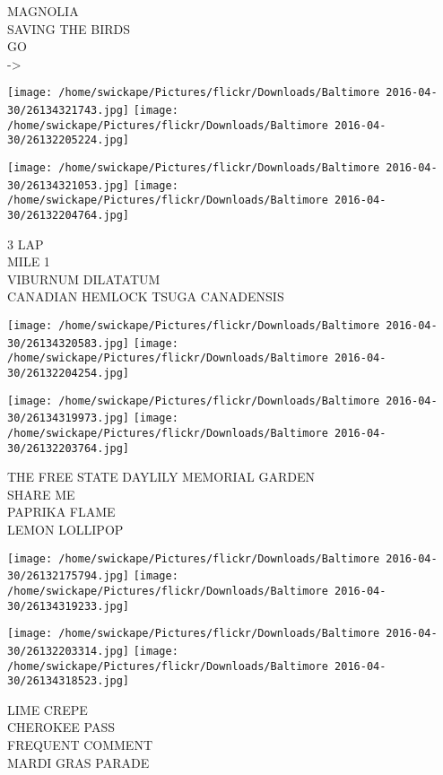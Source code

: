 \documentclass[10pt,letterpaper]{article}
\begin{document}
MAGNOLIA\\
SAVING THE BIRDS\\
GO\\
{-}>\\
\pagebreak

\texttt{[image: /home/swickape/Pictures/flickr/Downloads/Baltimore 2016-04-30/26134321743.jpg]}
\texttt{[image: /home/swickape/Pictures/flickr/Downloads/Baltimore 2016-04-30/26132205224.jpg]}

\texttt{[image: /home/swickape/Pictures/flickr/Downloads/Baltimore 2016-04-30/26134321053.jpg]}
\texttt{[image: /home/swickape/Pictures/flickr/Downloads/Baltimore 2016-04-30/26132204764.jpg]}

3 LAP\\
MILE 1\\
VIBURNUM DILATATUM\\
CANADIAN HEMLOCK TSUGA CANADENSIS\\
\pagebreak

\texttt{[image: /home/swickape/Pictures/flickr/Downloads/Baltimore 2016-04-30/26134320583.jpg]}
\texttt{[image: /home/swickape/Pictures/flickr/Downloads/Baltimore 2016-04-30/26132204254.jpg]}

\texttt{[image: /home/swickape/Pictures/flickr/Downloads/Baltimore 2016-04-30/26134319973.jpg]}
\texttt{[image: /home/swickape/Pictures/flickr/Downloads/Baltimore 2016-04-30/26132203764.jpg]}

THE FREE STATE DAYLILY MEMORIAL GARDEN\\
SHARE ME\\
PAPRIKA FLAME\\
LEMON LOLLIPOP\\
\pagebreak

\texttt{[image: /home/swickape/Pictures/flickr/Downloads/Baltimore 2016-04-30/26132175794.jpg]}
\texttt{[image: /home/swickape/Pictures/flickr/Downloads/Baltimore 2016-04-30/26134319233.jpg]}

\texttt{[image: /home/swickape/Pictures/flickr/Downloads/Baltimore 2016-04-30/26132203314.jpg]}
\texttt{[image: /home/swickape/Pictures/flickr/Downloads/Baltimore 2016-04-30/26134318523.jpg]}

LIME CREPE\\
CHEROKEE PASS\\
FREQUENT COMMENT\\
MARDI GRAS PARADE\\
\pagebreak
\end{document}
